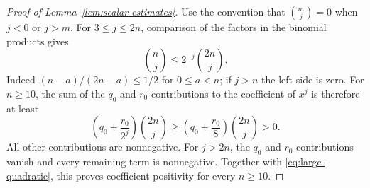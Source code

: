 \begin{proof}[Proof of Lemma~\ref{lem:scalar-estimates}]
Use the convention that $\binom mj=0$ when $j<0$ or $j>m$.  For
$3\le j\le2n$, comparison of the factors in the binomial products gives
\begin{equation}\label{eq:binomial-comparison}
 \binom nj\le 2^{-j}\binom{2n}{j}.
\end{equation}
Indeed $(n-a)/(2n-a)\le1/2$ for $0\le a<n$; if $j>n$ the left
side is zero.  For $n\ge10$, the sum of the $q_0$ and $r_0$
contributions to the coefficient of $x^j$ is therefore at least
\[
 \left(q_0+\frac{r_0}{2^j}\right)\binom{2n}{j}
 \ge\left(q_0+\frac{r_0}{8}\right)\binom{2n}{j}>0.
\]
All other contributions are nonnegative.  For $j>2n$, the $q_0$ and
$r_0$ contributions vanish and every remaining term is nonnegative.
Together with \eqref{eq:large-quadratic}, this proves coefficient
positivity for every $n\ge10$.


\end{proof}
